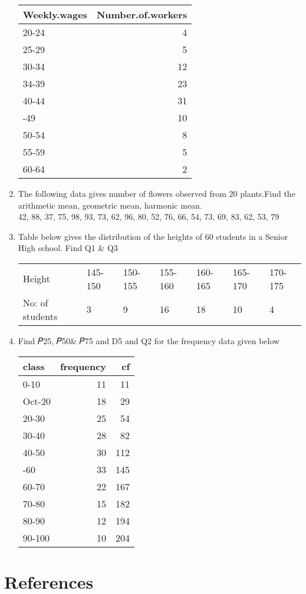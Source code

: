 \documentclass[
]{book}
\begin{document}
\begin{enumerate}
  \begin{table}[H]
  \centering
  \begin{tabular}[t]{lr}
  \toprule
  Weekly.wages & Number.of.workers\\
  \midrule
  20-24 & 4\\
  25-29 & 5\\
  30-34 & 12\\
  34-39 & 23\\
  40-44 & 31\\
  \addlinespace
  45-49 & 10\\
  50-54 & 8\\
  55-59 & 5\\
  60-64 & 2\\
  \bottomrule
  \end{tabular}
  \end{table}
\item
  The following data gives number of flowers observed from 20 plants.Find the arithmetic mean, geometric mean, harmonic mean.\\
  42, 88, 37, 75, 98, 93, 73, 62, 96, 80, 52, 76, 66, 54, 73, 69, 83, 62, 53, 79\\
\item
  Table below gives the distribution of the heights of 60 students in a Senior High school. Find Q1 \& Q3\\

  \begin{table}[H]
  \centering
  \begin{tabular}[t]{lllllll}
  \toprule
  Height & 145-150 & 150-155 & 155-160 & 160-165 & 165-170 & 170-175\\
  No: of students & 3 & 9 & 16 & 18 & 10 & 4\\
  \bottomrule
  \end{tabular}
  \end{table}
\item
  Find 𝑃25, 𝑃50\& 𝑃75 and D5 and Q2 for the frequency data given below

  \begin{table}[H]
  \centering
  \begin{tabular}[t]{lrr}
  \toprule
  class & frequency & cf\\
  \midrule
  0-10 & 11 & 11\\
  Oct-20 & 18 & 29\\
  20-30 & 25 & 54\\
  30-40 & 28 & 82\\
  40-50 & 30 & 112\\
  \addlinespace
  50-60 & 33 & 145\\
  60-70 & 22 & 167\\
  70-80 & 15 & 182\\
  80-90 & 12 & 194\\
  90-100 & 10 & 204\\
  \bottomrule
  \end{tabular}
  \end{table}
\end{enumerate}

\hypertarget{references}{%
\chapter{References}\label{references}}

  
\end{document}
